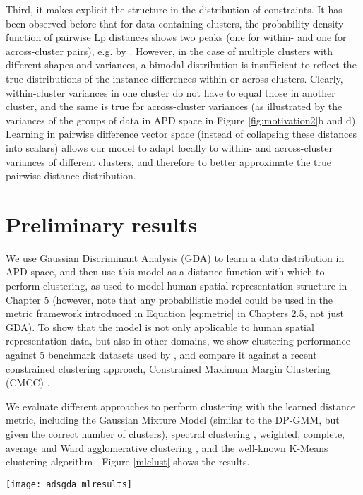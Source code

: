 Third, it makes explicit the structure in the distribution of constraints. It has been observed before that for data containing clusters, the probability density function of pairwise Lp distances shows two peaks (one for within- and one for across-cluster pairs), e.g. by \citep{brin1995near}. However, in the case of multiple clusters with different shapes and variances, a bimodal distribution is insufficient to reflect the true distributions of the instance differences within or across clusters. Clearly, within-cluster variances in one cluster do not have to equal those in another cluster, and the same is true for across-cluster variances (as illustrated by the variances of the groups of data in APD space in Figure \ref{fig:motivation2}b and d). Learning in pairwise difference vector space (instead of collapsing these distances into scalars) allows our model to adapt locally to within- and across-cluster variances of different clusters, and therefore to better approximate the true pairwise distance distribution. 

\section{Preliminary results}

We use Gaussian Discriminant Analysis (GDA) to learn a data distribution in APD space, and then use this model as a distance function with which to perform clustering, as used to model human spatial representation structure in Chapter 5 (however, note that any probabilistic model could be used in the metric framework introduced in Equation \ref{eq:metric} in Chapters 2.5, not just GDA). To show that the model is not only applicable to human spatial representation data, but also in other domains, we show clustering performance against 5 benchmark datasets used by \citep{zeng2012semi}, and compare it against a recent constrained clustering approach, Constrained Maximum Margin Clustering (CMCC) \citep{zeng2012semi}. 

We evaluate different approaches to perform clustering with the learned distance metric, including the Gaussian Mixture Model (similar to the DP-GMM, but given the correct number of clusters), spectral clustering \citep{ng2002spectral}, weighted, complete, average and Ward agglomerative clustering \citep{mullner2013fastcluster}, and the well-known K-Means clustering algorithm \citep{hartigan1979algorithm}. Figure \ref{mlclust} shows the results.


\begin{figure*}[t]
	\centering
	
	\texttt{[image: adsgda\_mlresults]}%
	
	\caption[Clustering results using the ADS-GDA metric on benchmark datasets]{\textbf{Clustering results using the ADS-GDA metric on benchmark datasets}. Evaluation metrics: NMI (normalized mutual information) and Accuracy (percentage of correctly assigned data points). Abbreviations: dim...dimensionality, n...number of data points, c...clusters.}
	\label{mlclust} 
\end{figure*}


